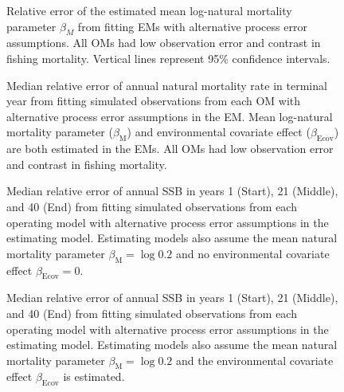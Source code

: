 \documentclass[
  12pt,
]{article}
\begin{document}
\begin{landscape}
\begin{figure}
\begin{center}
\end{center}
\caption{Relative error of the estimated mean log-natural mortality parameter $\beta_{M}$ from fitting EMs with alternative process error assumptions. All OMs had low observation error and contrast in fishing mortality. Vertical lines represent 95\% confidence intervals.}\label{median_log_M_bias}
\end{figure}
\end{landscape}

\begin{landscape}
\begin{figure}
\caption{Median relative error of annual natural mortality rate in terminal year from fitting simulated observations from each OM with alternative process error assumptions in the EM. Mean log-natural mortality parameter ($\beta_\text{M}$) and environmental covariate effect ($\beta_\text{Ecov}$) are both estimated in the EMs. All OMs had low observation error and contrast in fishing mortality.}\label{terminal_M_bias}
\begin{center}
\end{center}
\end{figure}
\end{landscape}

\begin{landscape}
\begin{figure}
\caption{Median relative error of annual SSB in years 1 (Start), 21 (Middle), and 40 (End) from fitting simulated observations from each operating model with alternative process error assumptions in the estimating model. Estimating models also assume the mean natural mortality parameter $\beta_\text{M} = \log 0.2$ and no environmental covariate effect $\beta_\text{Ecov} = 0$.}\label{SSB_bias_M_fixed_beta_fixed}
\begin{center}
\end{center}
\end{figure}
\end{landscape}

\begin{landscape}
\begin{figure}
\caption{Median relative error of annual SSB in years 1 (Start), 21 (Middle), and 40 (End) from fitting simulated observations from each operating model with alternative process error assumptions in the estimating model. Estimating models also assume the mean natural mortality parameter $\beta_\text{M} = \log 0.2$ and the environmental covariate effect $\beta_\text{Ecov}$ is estimated.}\label{SSB_bias_M_fixed_beta_estimated}
\begin{center}
\end{center}
\end{figure}
\end{landscape}
\end{document}
